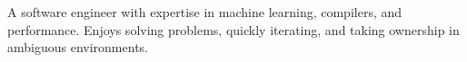 \vspace{-1.0em}
\begin{cventries}
  \vspace{-1.0em}
  \cventry
    {}
    {}
    {}
    {}
    {
        A software engineer with expertise in machine learning, compilers, and performance. Enjoys solving problems, quickly iterating, and taking ownership in ambiguous environments. 
    }
\end{cventries}